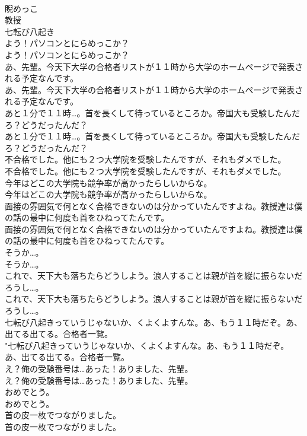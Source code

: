 \documentclass[8pt]{extreport}
\begin{document}
\begin{CJK}{UTF8}{min}
\\	睨めっこ
\\	教授
\\	七転び八起き
\\	よう！パソコンとにらめっこか？	
\\	よう！パソコンとにらめっこか？ 
\\	あ、先輩。今天下大学の合格者リストが１１時から大学のホームページで発表される予定なんです。	
\\	あ、先輩。今天下大学の合格者リストが１１時から大学のホームページで発表される予定なんです。 
\\	あと１分で１１時…。首を長くして待っているところか。帝国大も受験したんだろ？どうだったんだ？	
\\	あと１分で１１時…。首を長くして待っているところか。帝国大も受験したんだろ？どうだったんだ？ 
\\	不合格でした。他にも２つ大学院を受験したんですが、それもダメでした。	
\\	不合格でした。他にも２つ大学院を受験したんですが、それもダメでした。 
\\	今年はどこの大学院も競争率が高かったらしいからな。	
\\	今年はどこの大学院も競争率が高かったらしいからな。 
\\	面接の雰囲気で何となく合格できないのは分かっていたんですよね。教授達は僕の話の最中に何度も首をひねってたんです。	
\\	面接の雰囲気で何となく合格できないのは分かっていたんですよね。教授達は僕の話の最中に何度も首をひねってたんです。 
\\	そうか…。	
\\	そうか…。 
\\	これで、天下大も落ちたらどうしよう。浪人することは親が首を縦に振らないだろうし…。	
\\	これで、天下大も落ちたらどうしよう。浪人することは親が首を縦に振らないだろうし…。 
\\	七転び八起きっていうじゃないか、くよくよすんな。あ、もう１１時だぞ。あ、出てる出てる。合格者一覧。	
\\	"七転び八起きっていうじゃないか、くよくよすんな。あ、もう１１時だぞ。あ、出てる出てる。合格者一覧。 
\\	え？俺の受験番号は…あった！ありました、先輩。	
\\	え？俺の受験番号は…あった！ありました、先輩。 
\\	おめでとう。	
\\	おめでとう。 
\\	首の皮一枚でつながりました。	
\\	首の皮一枚でつながりました。 

\end{CJK}
\end{document}
